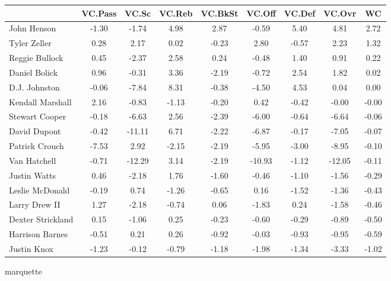 \documentclass[10pt,letterpaper]{article}
\begin{document}
\begin{table}[ht]
\begin{center}
\begin{tabular}{lcccccccc}
  \hline
 & VC.Pass & VC.Sc & VC.Reb & VC.BkSt & VC.Off & VC.Def & VC.Ovr & WC \\ 
  \hline
John Henson & -1.30 & -1.74 & 4.98 & 2.87 & -0.59 & 5.40 & 4.81 & 2.72 \\ 
  Tyler Zeller & 0.28 & 2.17 & 0.02 & -0.23 & 2.80 & -0.57 & 2.23 & 1.32 \\ 
  Reggie Bullock & 0.45 & -2.37 & 2.58 & 0.24 & -0.48 & 1.40 & 0.91 & 0.22 \\ 
  Daniel Bolick & 0.96 & -0.31 & 3.36 & -2.19 & -0.72 & 2.54 & 1.82 & 0.02 \\ 
  D.J. Johnston & -0.06 & -7.84 & 8.31 & -0.38 & -4.50 & 4.53 & 0.04 & 0.00 \\ 
  Kendall Marshall & 2.16 & -0.83 & -1.13 & -0.20 & 0.42 & -0.42 & -0.00 & -0.00 \\ 
  Stewart Cooper & -0.18 & -6.63 & 2.56 & -2.39 & -6.00 & -0.64 & -6.64 & -0.06 \\ 
  David Dupont & -0.42 & -11.11 & 6.71 & -2.22 & -6.87 & -0.17 & -7.05 & -0.07 \\ 
  Patrick Crouch & -7.53 & 2.92 & -2.15 & -2.19 & -5.95 & -3.00 & -8.95 & -0.10 \\ 
  Van Hatchell & -0.71 & -12.29 & 3.14 & -2.19 & -10.93 & -1.12 & -12.05 & -0.11 \\ 
  Justin Watts & 0.46 & -2.18 & 1.76 & -1.60 & -0.46 & -1.10 & -1.56 & -0.29 \\ 
  Leslie McDonald & -0.19 & 0.74 & -1.26 & -0.65 & 0.16 & -1.52 & -1.36 & -0.43 \\ 
  Larry Drew II & 1.27 & -2.18 & -0.74 & 0.06 & -1.83 & 0.24 & -1.58 & -0.46 \\ 
  Dexter Strickland & 0.15 & -1.06 & 0.25 & -0.23 & -0.60 & -0.29 & -0.89 & -0.50 \\ 
  Harrison Barnes & -0.51 & 0.21 & 0.26 & -0.92 & -0.03 & -0.93 & -0.95 & -0.59 \\ 
  Justin Knox & -1.23 & -0.12 & -0.79 & -1.18 & -1.98 & -1.34 & -3.33 & -1.02 \\ 
   \hline
\end{tabular}
\end{center}
\end{table}
\newpage
\begin{center}
marquette 
\end{center}
\end{document}
